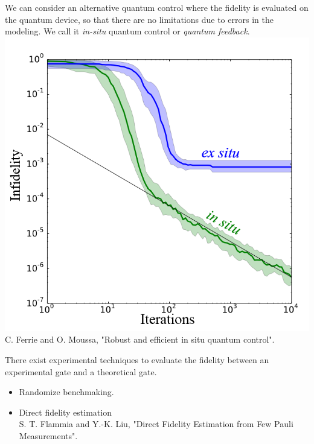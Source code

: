 \documentclass[12pt,aspectratio=169]{beamer}
\begin{document}
	\begin{frame}
		We can consider an alternative quantum control where the fidelity is evaluated on the quantum device, so that there are no limitations due to errors in the modeling. We call it \emph{in-situ} quantum control or \emph{quantum feedback}.
		\centering
		\includegraphics[scale=0.45]{fidelidad.png}\\
		
		{\scriptsize C. Ferrie and O. Moussa, "Robust and efficient in situ quantum control".}
	\end{frame}
	
	\begin{frame}
		There exist experimental techniques to evaluate the fidelity between an experimental gate and a theoretical gate.
		\vspace{0.3cm}
		\begin{itemize}
			\item Randomize benchmaking.
			\vspace{0.3cm}
			\item Direct fidelity estimation\\
			  {\scriptsize S. T. Flammia and Y.-K. Liu, "Direct Fidelity Estimation from Few Pauli Measurements".}
		\end{itemize}
	\end{frame}
	
\end{document}
